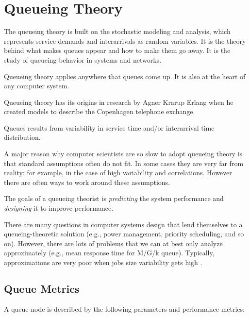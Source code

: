 \section{Queueing Theory}
\label{sec:Queueing-Theory}

The queueing theory is built on the stochastic modeling and analysis, which represents service demands and interarrivals as random variables.
It is the theory behind what makes queues appear and how to make them go away.
It is the study of queueing behavior in systems and networks.

Queueing theory applies anywhere that queues come up. It is also at the heart of any computer system.

Queueing theory has its origins in research by Agner Krarup Erlang when he created models to describe the Copenhagen telephone exchange.

Queues results from variability in service time and/or interarrival time distribution.

A major reason why computer scientists are so slow to adopt queueing theory is that standard assumptions often do not fit. In some cases they are very far from reality: for example, in the case of high variability and correlations. However there are often ways to work around these assumptions.

The goals of a queueing theorist is \textit{predicting} the system performance and \textit{designing} it to improve performance.

There are many questions in computer systems design that lend themselves to a queueing-theoretic solution (e.g., power management, priority scheduling, and so on).
However, there are  lots of problems that we can at best only analyze approximately (e.g., mean response time for M/G/k queue). Typically, approximations are very poor when jobs size variability gets high \cite{gupta2010inapproximability}.




\subsection{Queue Metrics}
\label{sec:Queue-Metrics}

A queue node is described by the following parameters and performance metrics:

